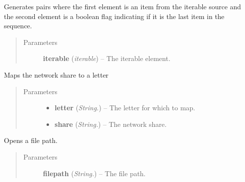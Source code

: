 \documentclass[letterpaper,10pt,english]{sphinxmanual}
\begin{document}

\begin{fulllineitems}
\label{api:utils.IterIsLast}
Generates pairs where the first element is an item from the iterable
source and the second element is a boolean flag indicating if it is the
last item in the sequence.
\begin{quote}\begin{description}
\item[{Parameters}] \leavevmode
\textbf{iterable} (\emph{iterable}) -- The iterable element.

\end{description}\end{quote}

\end{fulllineitems}


\begin{fulllineitems}
\label{api:utils.MapNetworkShare}
Maps the network share to a letter
\begin{quote}\begin{description}
\item[{Parameters}] \leavevmode\begin{itemize}
\item {} 
\textbf{letter} (\emph{String.}) -- The letter for which to map.

\item {} 
\textbf{share} (\emph{String.}) -- The network share.

\end{itemize}

\end{description}\end{quote}

\end{fulllineitems}


\begin{fulllineitems}
\label{api:utils.OpenFile}
Opens a file path.
\begin{quote}\begin{description}
\item[{Parameters}] \leavevmode
\textbf{filepath} (\emph{String.}) -- The file path.

\end{description}\end{quote}

\end{fulllineitems}
\end{document}
